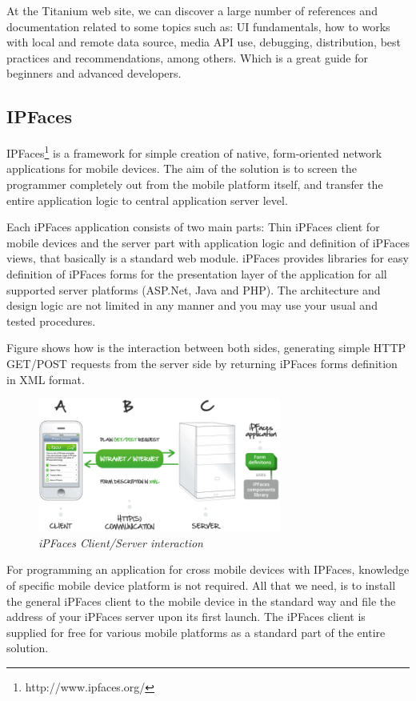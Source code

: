 \documentclass[a4paper,12pt]{book}
\begin{document}
At the Titanium web site, we can discover a large number of references and documentation related to some topics such as: UI fundamentals, how to works with local and remote data source, media API use, debugging, distribution, best practices and recommendations, among others. Which is a great guide for beginners and advanced developers.

\subsection{IPFaces}
\label{IPFaces} 

IPFaces\footnote{http://www.ipfaces.org/} is a framework for simple creation of native, form-oriented network applications for mobile devices. The aim of the solution is to screen the programmer completely out from the mobile platform itself, and transfer the entire application logic to central application server level.

Each iPFaces application consists of two main parts: Thin iPFaces client for mobile devices and the server part with application logic and definition of iPFaces views, that basically  is a standard web module. iPFaces provides libraries for easy definition of iPFaces forms for the presentation layer of the application for all supported server platforms (ASP.Net, Java and PHP). The architecture and design logic are not limited in any manner and you may use your usual and tested procedures. 

Figure shows how is the interaction between both sides, generating simple HTTP GET/POST requests from the server side by returning iPFaces forms definition in XML format.

\begin{figure}[H]
    \centering
    \includegraphics[width=8cm, keepaspectratio]{img/ipfaces.png}
    \caption{\textit{iPFaces Client/Server interaction}}
 \end{figure}

For programming an application for  cross mobile devices with IPFaces, knowledge of specific mobile device platform is not required.  All that we need,  is to install the general iPFaces client to the mobile device in the standard way and file the address of your iPFaces server upon its first launch. The iPFaces client is supplied for free for various mobile platforms as a standard part of the entire solution.
\end{document}
